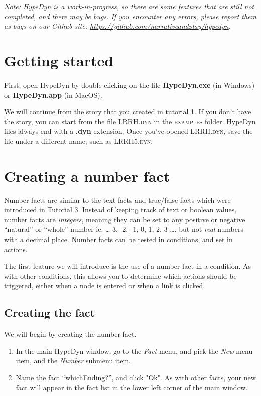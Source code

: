 \documentclass{article}
\begin{document}
\textit{Note:  HypeDyn is a work-in-progress, so there are some features that are still
not completed, and there may be bugs. If you encounter any errors, please
report them as bugs on our Github site: \url{https://github.com/narrativeandplay/hypedyn}.}

\section{Getting started}

First, open HypeDyn by double-clicking on the file \textbf{HypeDyn.exe} (in
Windows) or \textbf{HypeDyn.app} (in MacOS).

We will continue from the story that you created in tutorial 1. If you don't
have the story, you can start from the file \textsc{LRRH.dyn} in the
\textsc{examples} folder. HypeDyn files always end with a \textbf{.dyn} extension.
Once you've opened \textsc{LRRH.dyn}, save the file under a different 
name, such as \textsc{LRRH5.dyn}.

\section{Creating a number fact}

Number facts are similar to the text facts and true/false facts which 
were introduced in Tutorial 3. Instead of keeping track of text or 
boolean values, number facts are \textit{integers}, meaning they can be set 
to any positive or negative ``natural'' or ``whole'' number ie. \dots -3, 
-2, -1, 0, 1, 2, 3 \dots, but not \textit{real} numbers with a 
decimal place. Number facts can be tested in conditions, and set in 
actions.

The first feature we will introduce is the use of a number fact in a condition.
As with other conditions, this allows you to determine which actions should be
triggered, either when a node is entered or when a link is clicked.

\subsection{Creating the fact}

We will begin by creating the number fact.

\begin{enumerate}
  \item In the main HypeDyn window, go to the \textit{Fact} menu, and 
  pick the \textit{New} menu item, and the \textit{Number} submenu item. 
  \item Name the fact ``whichEnding?'', and click "Ok". As with other 
  facts, your new fact will appear in the fact list in the lower left 
  corner of the main window.  
\end{enumerate}
\end{document}
